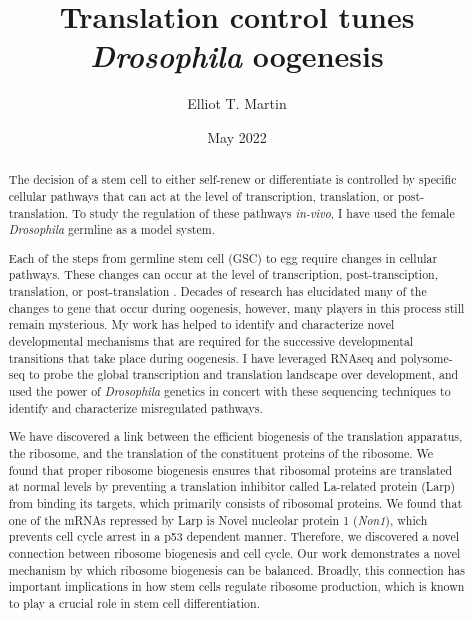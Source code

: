 \documentclass[12pt,oneside]{reedthesis}
\title{Translation control tunes \emph{Drosophila} oogenesis}
\author{Elliot T. Martin}
\date{May 2022}
\begin{document}
  \maketitle

\frontmatter %
\pagestyle{plain} %
  \begin{abstract}
  \setcounter{page}{2}
  \pagestyle{plain}

    \par

    The decision of a stem cell to either self-renew or differentiate is controlled by specific cellular pathways that can act at the level of transcription, translation, or post-translation. To study the regulation of these pathways \emph{in-vivo}, I have used the female \emph{Drosophila} germline as a model system.

    \par

    Each of the steps from germline stem cell (GSC) to egg require changes in cellular pathways. These changes can occur at the level of transcription, post-transciption, translation, or post-translation . Decades of research has elucidated many of the changes to gene that occur during oogenesis, however, many players in this process still remain mysterious. My work has helped to identify and characterize novel developmental mechanisms that are required for the successive developmental transitions that take place during oogenesis. I have leveraged RNAseq and polysome-seq to probe the global transcription and translation landscape over development, and used the power of \emph{Drosophila} genetics in concert with these sequencing techniques to identify and characterize misregulated pathways.

    \par

    We have discovered a link between the efficient biogenesis of the translation apparatus, the ribosome, and the translation of the constituent proteins of the ribosome. We found that proper ribosome biogenesis ensures that ribosomal proteins are translated at normal levels by preventing a translation inhibitor called La-related protein (Larp) from binding its targets, which primarily consists of ribosomal proteins. We found that one of the mRNAs repressed by Larp is Novel nucleolar protein 1 (\emph{Non1}), which prevents cell cycle arrest in a p53 dependent manner. Therefore, we discovered a novel connection between ribosome biogenesis and cell cycle. Our work demonstrates a novel mechanism by which ribosome biogenesis can be balanced. Broadly, this connection has important implications in how stem cells regulate ribosome production, which is known to play a crucial role in stem cell differentiation.


\end{abstract}
\end{document}
